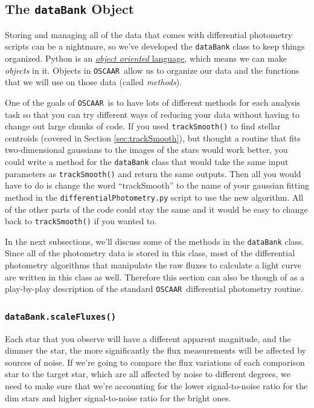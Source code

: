 \documentclass[a4paper]{article}
\newcommand{\code}[1]{\texttt{#1}}
\newcommand{\oscaar}{\code{OSCAAR}~}
\begin{document}
\subsection{The \code{dataBank} Object}
Storing and managing all of the data that comes with differential photometry scripts can be a nightmare, so we've developed the \code{dataBank} class to keep things organized. Python is an \href{https://en.wikipedia.org/wiki/Object-oriented_programming}{\textit{object oriented} language}, which means we can make \textit{objects} in it. Objects in \oscaar allow us to organize our data and the functions that we will use on those data (called \textit{methods}). 

One of the goals of \oscaar is to have lots of different methods for each analysis task so that you can try different ways of reducing your data without having to change out large chunks of code. If you used \code{trackSmooth()} to find stellar centroids (covered in Section \ref{sec:trackSmooth}), but thought a routine that fits two-dimensional gaussians to the images of the stars would work better, you could write a method for the \code{dataBank} class that would take the same input parameters as \code{trackSmooth()} and return the same outputs. Then all you would have to do is change the word ``trackSmooth'' to the name of your gaussian fitting method in the \code{differentialPhotometry.py} script to use the new algorithm. All of the other parts of the code could stay the same and it would be easy to change back to \code{trackSmooth()} if you wanted to. 

In the next subsections, we'll discuss some of the methods in the \code{dataBank} class. Since all of the photometry data is stored in this class, most of the differential photometry algorithms that manipulate the raw fluxes to calculate a light curve are written in this class as well. Therefore this section can also be though of as a play-by-play description of the standard \oscaar differential photometry routine.


\subsubsection{\code{dataBank.scaleFluxes()}}

Each star that you observe will have a different apparent magnitude, and the dimmer the star, the more significantly the flux measurements will be affected by sources of noise. If we're going to compare the flux variations of each comparison star to the target star, which are all affected by noise to different degrees, we need to make sure that we're accounting for the lower signal-to-noise ratio for the dim stars and higher signal-to-noise ratio for the bright ones. 
\end{document}
